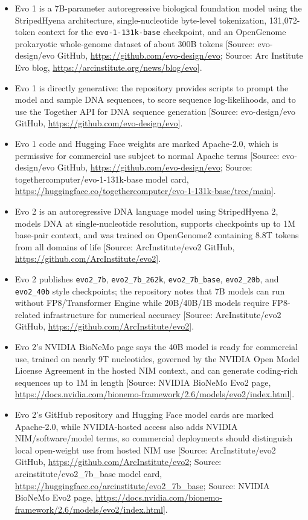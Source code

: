 \documentclass[11pt]{report}
\begin{document}
\begin{itemize}
\item Evo 1 is a 7B-parameter autoregressive biological foundation model using the StripedHyena architecture, single-nucleotide byte-level tokenization, 131,072-token context for the \texttt{evo-1-131k-base} checkpoint, and an OpenGenome prokaryotic whole-genome dataset of about 300B tokens [Source: evo-design/evo GitHub, \url{https://github.com/evo-design/evo}; Source: Arc Institute Evo blog, \url{https://arcinstitute.org/news/blog/evo}].
\item Evo 1 is directly generative: the repository provides scripts to prompt the model and sample DNA sequences, to score sequence log-likelihoods, and to use the Together API for DNA sequence generation [Source: evo-design/evo GitHub, \url{https://github.com/evo-design/evo}].
\item Evo 1 code and Hugging Face weights are marked Apache-2.0, which is permissive for commercial use subject to normal Apache terms [Source: evo-design/evo GitHub, \url{https://github.com/evo-design/evo}; Source: togethercomputer/evo-1-131k-base model card, \url{https://huggingface.co/togethercomputer/evo-1-131k-base/tree/main}].
\item Evo 2 is an autoregressive DNA language model using StripedHyena 2, models DNA at single-nucleotide resolution, supports checkpoints up to 1M base-pair context, and was trained on OpenGenome2 containing 8.8T tokens from all domains of life [Source: ArcInstitute/evo2 GitHub, \url{https://github.com/ArcInstitute/evo2}].
\item Evo 2 publishes \texttt{evo2\_7b}, \texttt{evo2\_7b\_262k}, \texttt{evo2\_7b\_base}, \texttt{evo2\_20b}, and \texttt{evo2\_40b} style checkpoints; the repository notes that 7B models can run without FP8/Transformer Engine while 20B/40B/1B models require FP8-related infrastructure for numerical accuracy [Source: ArcInstitute/evo2 GitHub, \url{https://github.com/ArcInstitute/evo2}].
\item Evo 2's NVIDIA BioNeMo page says the 40B model is ready for commercial use, trained on nearly 9T nucleotides, governed by the NVIDIA Open Model License Agreement in the hosted NIM context, and can generate coding-rich sequences up to 1M in length [Source: NVIDIA BioNeMo Evo2 page, \url{https://docs.nvidia.com/bionemo-framework/2.6/models/evo2/index.html}].
\item Evo 2's GitHub repository and Hugging Face model cards are marked Apache-2.0, while NVIDIA-hosted access also adds NVIDIA NIM/software/model terms, so commercial deployments should distinguish local open-weight use from hosted NIM use [Source: ArcInstitute/evo2 GitHub, \url{https://github.com/ArcInstitute/evo2}; Source: arcinstitute/evo2\_7b\_base model card, \url{https://huggingface.co/arcinstitute/evo2_7b_base}; Source: NVIDIA BioNeMo Evo2 page, \url{https://docs.nvidia.com/bionemo-framework/2.6/models/evo2/index.html}].

\end{itemize}
\end{document}
